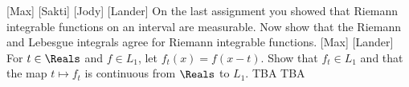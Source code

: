 \documentclass[minion]{homework}
\begin{document}
\begin{aproblems}

 [Max]
 [Sakti]
 [Jody]
 [Lander]
\hproblem [David]
On the last assignment you showed that
Riemann integrable functions on an interval are measurable.  Now show that
the Riemann and Lebesgue integrals agree for Riemann integrable functions.
 [Max]
 [Lander]
\hproblem [Jody]
For $t\in\Reals$ and $f\in L_1$, let $f_t(x)=f(x-t)$.  
Show that $f_t\in L_1$ and that the map $t\mapsto f_t$
is continuous from $\Reals$ to $L_1$.
\hproblem TBA
\hproblem TBA


\end{aproblems}
\end{document}
